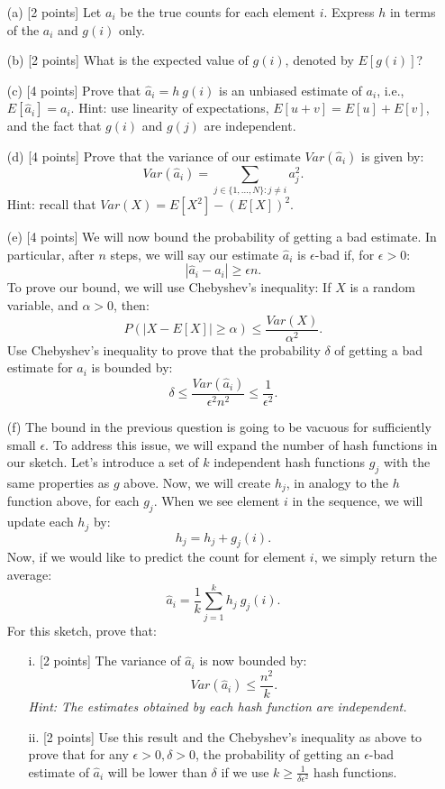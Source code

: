 \documentclass[12pt]{article}
\begin{document}
{\begin{itemize}
\item[{(a)}][2 points] Let $a_i$ be the true counts for each element $i$.  Express
  $h$ in terms of the $a_i$ and $g(i)$ only.
\item[{(b)}][2 points] What is the expected value of $g(i)$, denoted by $E[g(i)]$?
\item[{(c)}][4 points] Prove that $\hat{a}_i = h \  g(i)$ is an unbiased estimate
of $a_i$, i.e., $E[\hat{a}_i] = a_i$.  Hint: use linearity of
expectations, $E[u+v] = E[u] + E[v]$, and the fact that $g(i)$ and
$g(j)$ are independent.  
\item[{(d)}][4 points] Prove that the variance of our estimate $Var(\hat{a}_i)$ is
  given by:
\[
Var(\hat{a}_i) = \sum_{j\in\{1,\ldots,N\}:j\neq i} a_j^2.
\]
Hint: recall that $Var(X) = E[X^2] - (E[X])^2$.
\item[{(e)}][4 points] We will now bound the probability of getting a bad
  estimate.  In particular, after $n$ steps, we will say our estimate
  $\hat{a}_i$ is $\epsilon$-bad if, for $\epsilon>0$:
\[
|\hat{a}_i - a_i| \geq \epsilon n.
\]
To prove our bound, we will use Chebyshev's inequality: If $X$ is a
random variable, and $\alpha >0$, then:
\[
P(|X-E[X]| \geq \alpha) \leq \frac{Var(X)}{\alpha^2}.
\]
Use Chebyshev's inequality to prove that the probability
  $\delta$ of getting a bad estimate for $\hat{a}_i$ is bounded by:
\[
\delta \leq \frac{Var(\hat{a}_i)}{\epsilon^2 n^2} \leq \frac{1}{\epsilon^2} .
\] 
\item[{(f)}] The bound in the previous question is going to be vacuous for
  sufficiently small $\epsilon$.  To address this issue, we will
  expand the number of hash functions in our sketch.  Let's introduce
  a set of $k$ independent hash functions $g_j$ with the same properties
  as $g$ above.  Now, we will create $h_j$, in analogy to the $h$ function
  above, for each $g_j$.  When we see element $i$ in the sequence, we
  will update each $h_j$ by:
\[
h_j = h_j + g_j(i).
\]
Now, if we would like to predict the count for element $i$,
we simply return the average:
\[
\hat{a}_i = \frac{1}{k} \sum_{j=1}^k h_j \  g_j(i).
\]
For this sketch, prove that:
\begin{enumerate}
\item[{i.}][2 points] The variance of $\hat{a}_i$ is now bounded by:
\[
Var(\hat{a}_i) \leq \frac{n^2}{k}.
\]
\emph{Hint: The estimates obtained by each hash function are independent.} 
\item[{ii.}][2 points] Use this result and the Chebyshev's inequality as above to
  prove that for any $\epsilon>0,\delta>0$, the probability of getting an $\epsilon$-bad estimate of
  $\hat{a}_i$ will be lower than $\delta$ if we use $k \geq
  \frac{1}{\delta\epsilon^2}$ hash functions.
\end{enumerate}

\end{itemize}
}
\end{document}

